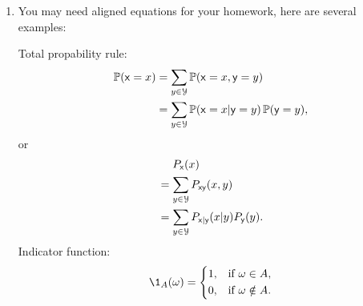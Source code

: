 \documentclass[a4paper]{article}
\begin{document}
\begin{enumerate}
\begin{enumerate}
\begin{enumerate}
      \end{enumerate}
    \item You may find \url{https://en.wikibooks.org/wiki/LaTeX} useful.
    \item Writing \LaTeX\ online may be easier for beginners:
        \begin{enumerate}
        \item ShareLaTeX: \url{https://www.sharelatex.com/}.
        \item Overleaf: \url{https://www.overleaf.com/}.
        \end{enumerate}
    \end{enumerate}
  \item You may need aligned equations for your homework, here are several examples:
    
    Total propability rule:
  \begin{equation*}
    \begin{aligned}
      \operatorname{\mathbb{P}}(\mathsf{x} = x)
      &= \sum_{y \in \mathcal{Y}} \operatorname{\mathbb{P}}(\mathsf{x} = x, \mathsf{y} = y)\\
      &= \sum_{y \in \mathcal{Y}} \operatorname{\mathbb{P}}(\mathsf{x} = x| \mathsf{y} = y) \operatorname{\mathbb{P}}(\mathsf{y} = y),\\
    \end{aligned}
  \end{equation*}
  or
  \begin{equation*}
    \begin{aligned}
      &\quad~  P_{\mathsf{x}}(x)\\
      &= \sum_{y \in \mathcal{Y}} P_{\mathsf{x}\mathsf{y}}(x,y)\\
      &= \sum_{y \in \mathcal{Y}} P_{\mathsf{x}|\mathsf{y}}(x|y)P_{\mathsf{y}}(y).\\
    \end{aligned}
  \end{equation*}
  Indicator function:
  \begin{equation*}
    \1_A(\omega)=
    \left\{
    \begin{aligned}
      1, &\quad\text{if}~ \omega \in A,\\
      0, &\quad\text{if}~ \omega \notin A.
    \end{aligned}
    \right.
  \end{equation*}


\end{enumerate}
\end{document}
